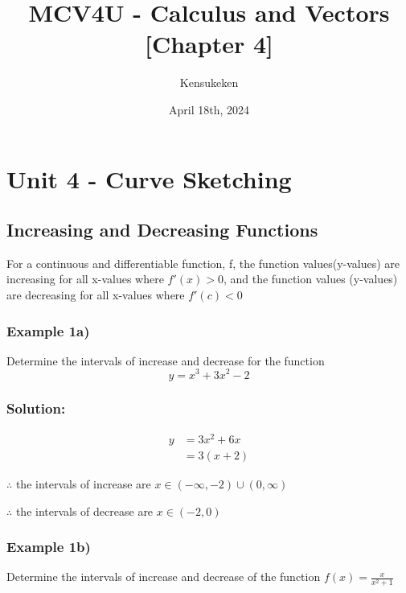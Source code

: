 \documentclass{article}
\title{MCV4U - Calculus and Vectors [Chapter 4]}
\author{Kensukeken}
\date{April 18th, 2024}
\begin{document}
\maketitle

\tableofcontents
\newpage
\section{Unit 4 - Curve Sketching}
\subsection{Increasing and Decreasing Functions}
For a continuous and differentiable function, f, the function values(y-values) are increasing for all x-values where $f'(x)>0$, and the function values (y-values) are decreasing for all x-values where $f'(c)<0$
\subsubsection{Example 1a)}
Determine the intervals of increase and decrease for the function $$y=x^3+3x^2-2$$
\subsubsection*{Solution:}
\begin{align*}
    y&=3x^2+6x\\
    &=3(x+2)
\end{align*}
\begin{center}
\end{center}

$\therefore$ the intervals of increase are $x\in(-\infty,-2)\cup(0, \infty)$

$\therefore$ the intervals of decrease are $x\in (-2,0)$

\subsubsection{Example 1b)}
Determine the intervals of increase and decrease of the function $f(x)=\frac{x}{x^2+1}$
\end{document}
